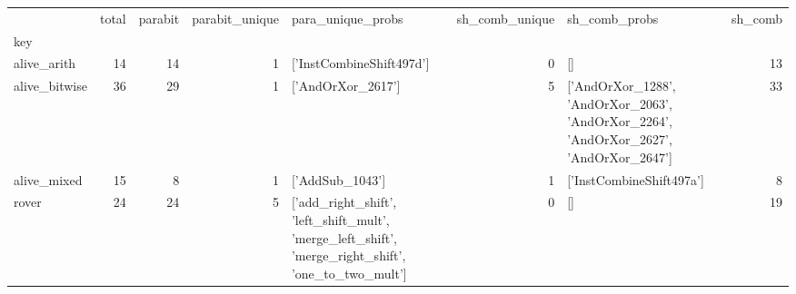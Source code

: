 \begin{tabular}{lrrrlrlr}
\toprule
 & total & parabit & parabit_unique & para_unique_probs & sh_comb_unique & sh_comb_probs & sh_comb \\
key &  &  &  &  &  &  &  \\
\midrule
alive_arith & 14 & 14 & 1 & ['InstCombineShift497d'] & 0 & [] & 13 \\
alive_bitwise & 36 & 29 & 1 & ['AndOrXor_2617'] & 5 & ['AndOrXor_1288', 'AndOrXor_2063', 'AndOrXor_2264', 'AndOrXor_2627', 'AndOrXor_2647'] & 33 \\
alive_mixed & 15 & 8 & 1 & ['AddSub_1043'] & 1 & ['InstCombineShift497a'] & 8 \\
rover & 24 & 24 & 5 & ['add_right_shift', 'left_shift_mult', 'merge_left_shift', 'merge_right_shift', 'one_to_two_mult'] & 0 & [] & 19 \\
\bottomrule
\end{tabular}
